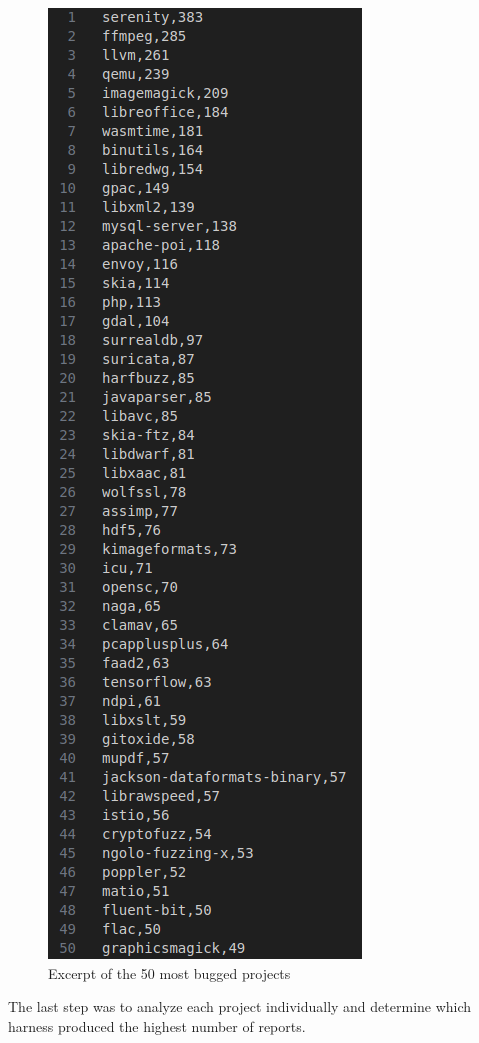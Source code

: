\begin{figure}[h]
\centering
\includegraphics[scale=0.44]{foto/list.png}
\caption{Excerpt of the 50 most bugged projects}
\label{fig:list}
\end{figure}

The last step was to analyze each project individually and determine which harness produced the highest number of reports.

